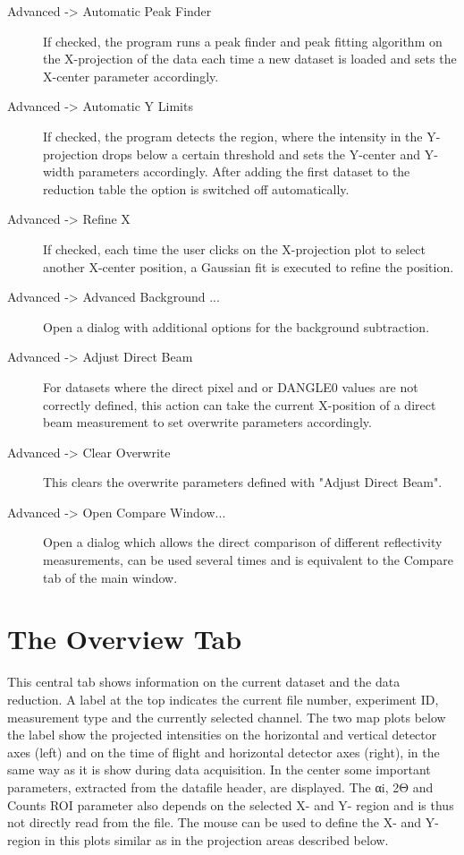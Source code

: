\begin{description}
   \item[{ Advanced -> Automatic Peak Finder}] If checked, the program runs a peak finder and peak fitting algorithm on the X-projection of the data each time a new dataset is loaded and sets the X-center parameter accordingly.
   \item[{ Advanced -> Automatic Y Limits}] If checked, the program detects the region, where the intensity in the Y-projection drops below a certain threshold and sets the Y-center and Y-width parameters accordingly. After adding the first dataset to the reduction table the option is switched off automatically.
   \item[{ Advanced -> Refine X}] If checked, each time the user clicks on the X-projection plot to select another X-center position, a Gaussian fit is executed to refine the position.
   \item[{Advanced -> Advanced Background ...}] Open a dialog with additional options for the background subtraction.
   \item[{ Advanced -> Adjust Direct Beam}] For datasets where the direct pixel and or DANGLE0 values are not correctly defined, this action can take the current X-position of a direct beam measurement to set overwrite parameters accordingly.
   \item[{ Advanced -> Clear Overwrite}] This clears the overwrite parameters defined with "Adjust Direct Beam".
   \item[{ Advanced -> Open Compare Window...}] Open a dialog which allows the direct comparison of different reflectivity measurements, can be used several times and is equivalent to the Compare tab of the main window.
  \end{description}

\section{The Overview Tab}
  This central tab shows information on the current dataset and the data reduction. A label at the top indicates the current file number, experiment ID, measurement type and the currently selected channel.
  The two map plots below the label show the projected intensities on the horizontal and vertical detector axes (left) and on the time of flight and horizontal detector axes (right), in the same way as it is show during data acquisition.
  In the center some important parameters, extracted from the datafile header, are displayed. The αi, 2Θ and Counts ROI parameter also depends on the selected X- and Y- region and is thus not directly read from the file.
  The mouse can be used to define the X- and Y-region in this plots similar as in the projection areas described below.
  
